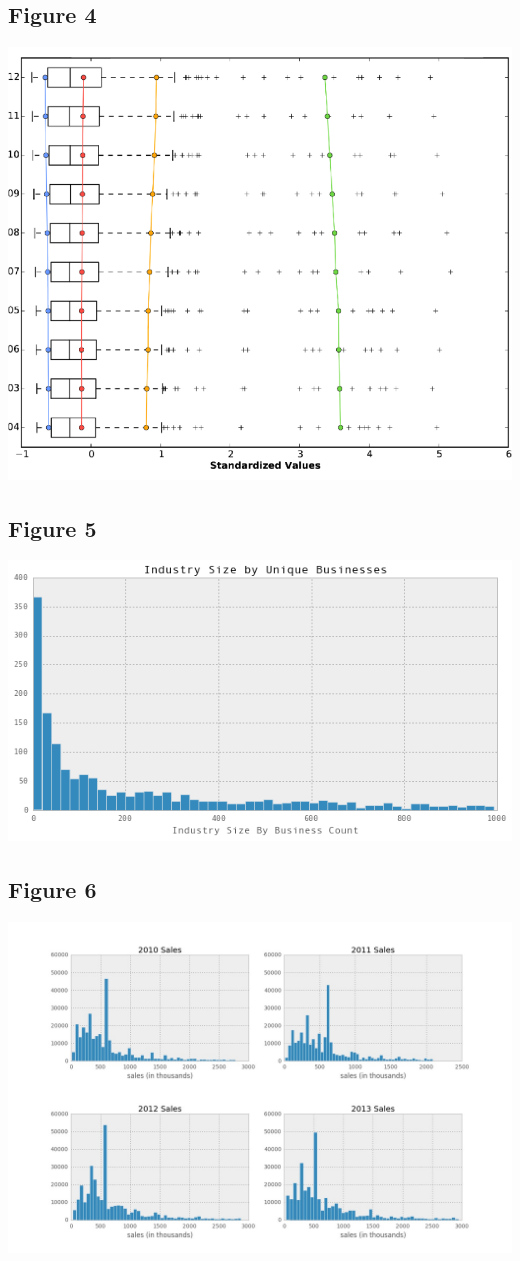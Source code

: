\documentclass[article, 11pt]{article} %
\begin{document}
\subsection*{Figure 4}
\hfill\includegraphics[width=.95\textwidth]{4}\hspace*{\fill}
\subsection*{Figure 5}
\includegraphics[width=1.0\textwidth]{5}
\pagebreak
\subsection*{Figure 6}
\includegraphics[width=1.0\textwidth]{6}
\pagebreak
\end{document}
